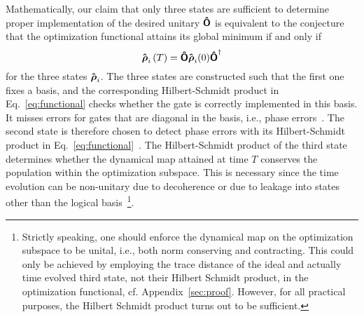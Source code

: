 Mathematically, our claim  that only three states are sufficient to
determine proper implementation of the desired unitary $\boldsymbol{\mathsf{\hat{O}}}$ 
is equivalent to the conjecture that the optimization functional
attains its global minimum if and only if
\begin{equation}
  \label{eq:cond}
  \boldsymbol{\mathsf{\hat{\rho}}}_{i}\left(T\right) =
  \boldsymbol{\mathsf{\hat{O}}}\boldsymbol{\mathsf{\hat{\rho}}}_{i}(0)\boldsymbol{\mathsf{\hat{O}}}^{\dagger}
\end{equation}
for the three states $\boldsymbol{\mathsf{\hat{\rho}}}_i$. The three states are constructed
such that the first one fixes a basis, and the corresponding
Hilbert-Schmidt product in Eq.~\eqref{eq:functional} checks whether
the gate is correctly implemented in this basis. It misses errors
for gates that are diagonal in the basis, i.e., phase
errors~\cite{ReichKochPRA13}. The second state is therefore chosen to
detect phase errors with its Hilbert-Schmidt product in
Eq.~\eqref{eq:functional}~\cite{ReichKochPRA13}. The Hilbert-Schmidt
product of the third state determines 
whether the dynamical map attained at time $T$ conserves the
population within the optimization subspace. This is necessary since
the time evolution can  be non-unitary due to decoherence or due to
leakage into states other than the logical basis~\footnote{%
  Strictly speaking, one should enforce the dynamical map on the
  optimization subspace to be unital, i.e., both norm conserving
  and contracting. This could only be achieved by employing the trace
  distance  of the ideal and actually time evolved third state,
  not their Hilbert Schmidt product, in the optimization functional,
  cf. Appendix~\ref{sec:proof}. However, for all practical purposes,
  the Hilbert Schmidt product turns out to be sufficient.
}. 

